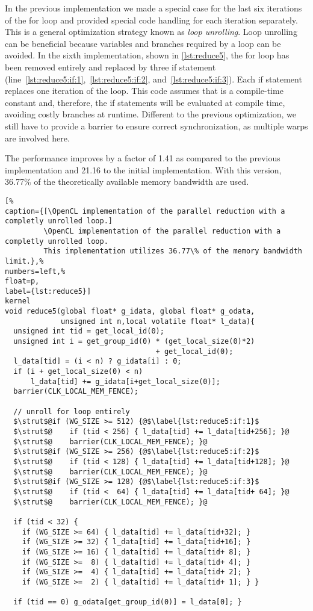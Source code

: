 In the previous implementation we made a special case for the last six iterations of the for loop and provided special code handling for each iteration separately.
This is a general optimization strategy known as \emph{loop unrolling}.
Loop unrolling can be beneficial because variables and branches required by a loop can be avoided.
In the sixth implementation, shown in \autoref{lst:reduce5}, the for loop has been removed entirely and replaced by three if statement (line~\ref{lst:reduce5:if:1},~\ref{lst:reduce5:if:2}, and~\ref{lst:reduce5:if:3}).
Each if statement replaces one iteration of the loop.
This code assumes that  is a compile-time constant and, therefore, the if statements will be evaluated at compile time, avoiding costly branches at runtime.
Different to the previous optimization, we still have to provide a barrier to ensure correct synchronization, as multiple warps are involved here.

The performance improves by a factor of 1.41 as compared to the previous implementation and 21.16 to the initial implementation.
With this version, 36.77\% of the theoretically available memory bandwidth are used.

\begin{lstlisting}[%
caption={[\OpenCL implementation of the parallel reduction with a completly unrolled loop.]
         \OpenCL implementation of the parallel reduction with a completly unrolled loop.
         This implementation utilizes 36.77\% of the memory bandwidth limit.},%
numbers=left,%
float=p,
label={lst:reduce5}]
kernel
void reduce5(global float* g_idata, global float* g_odata,
             unsigned int n,local volatile float* l_data){
  unsigned int tid = get_local_id(0);
  unsigned int i = get_group_id(0) * (get_local_size(0)*2)
                                   + get_local_id(0);
  l_data[tid] = (i < n) ? g_idata[i] : 0;
  if (i + get_local_size(0) < n)
      l_data[tid] += g_idata[i+get_local_size(0)];
  barrier(CLK_LOCAL_MEM_FENCE);

  // unroll for loop entirely
  $\strut$@if (WG_SIZE >= 512) {@$\label{lst:reduce5:if:1}$
  $\strut$@    if (tid < 256) { l_data[tid] += l_data[tid+256]; }@
  $\strut$@    barrier(CLK_LOCAL_MEM_FENCE); }@
  $\strut$@if (WG_SIZE >= 256) {@$\label{lst:reduce5:if:2}$
  $\strut$@    if (tid < 128) { l_data[tid] += l_data[tid+128]; }@
  $\strut$@    barrier(CLK_LOCAL_MEM_FENCE); }@
  $\strut$@if (WG_SIZE >= 128) {@$\label{lst:reduce5:if:3}$
  $\strut$@    if (tid <  64) { l_data[tid] += l_data[tid+ 64]; }@
  $\strut$@    barrier(CLK_LOCAL_MEM_FENCE); }@

  if (tid < 32) {
    if (WG_SIZE >= 64) { l_data[tid] += l_data[tid+32]; }
    if (WG_SIZE >= 32) { l_data[tid] += l_data[tid+16]; }
    if (WG_SIZE >= 16) { l_data[tid] += l_data[tid+ 8]; }
    if (WG_SIZE >=  8) { l_data[tid] += l_data[tid+ 4]; }
    if (WG_SIZE >=  4) { l_data[tid] += l_data[tid+ 2]; }
    if (WG_SIZE >=  2) { l_data[tid] += l_data[tid+ 1]; } }

  if (tid == 0) g_odata[get_group_id(0)] = l_data[0]; }
\end{lstlisting}


